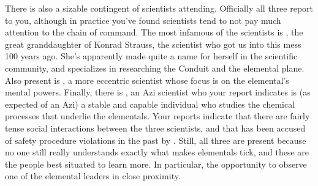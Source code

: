 \documentclass[char]{elementals}
\begin{document}
There is also a sizable contingent of scientists attending. Officially all three report to you, although in practice you've found scientists tend to not pay much attention to the chain of command. The most infamous of the scientists is \cGD{\intro}, the great granddaughter of Konrad Strauss, the scientist who got us into this mess 100 years ago. She's apparently made quite a name for herself in the scientific community, and specializes in researching the Conduit and the elemental plane. Also present is \cMS{\intro}, a more eccentric scientist whose focus is on the elemental's mental powers. Finally, there is \cScientist{\intro}, an Azi scientist who your report indicates is (as expected of an Azi) a stable and capable individual who studies the chemical processes that underlie the elementals. Your reports indicate that there are fairly tense social interactions between the three scientists, and that \cMS{} has been accused of safety procedure violations in the past by \cScientist{}. Still, all three are present because no one still really understands exactly what makes elementals tick, and these are the people best situated to learn more. In particular, the opportunity to observe one of the elemental leaders in close proximity.

\end{document}
